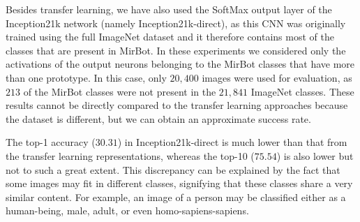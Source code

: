 \documentclass[final, twocolumn]{elsarticle}
\begin{document}
Besides transfer learning, we have also used the SoftMax output layer of the Inception21k network (namely Inception21k-direct), as this CNN was originally trained using the full ImageNet dataset and it therefore contains most of the classes that are present in MirBot. In these experiments we considered only the activations of the output neurons belonging to the MirBot classes that have more than one prototype. In this case, only $20,400$ images were used for evaluation, as $213$ of the MirBot classes were not present in the $21,841$ ImageNet classes. These results cannot be directly compared to the transfer learning approaches because the dataset is different, but we can obtain an approximate success rate. 

The top-1 accuracy ($30.31$) in Inception21k-direct is much lower than that from the transfer learning representations, whereas the top-10 ($75.54$) is also lower but not to such a great extent.  This discrepancy can be explained by the fact that some images may fit in different classes, signifying that these classes share a very similar content. For example, an image of a person may be classified either as a human-being, male, adult, or even homo-sapiens-sapiens. 
\end{document}
